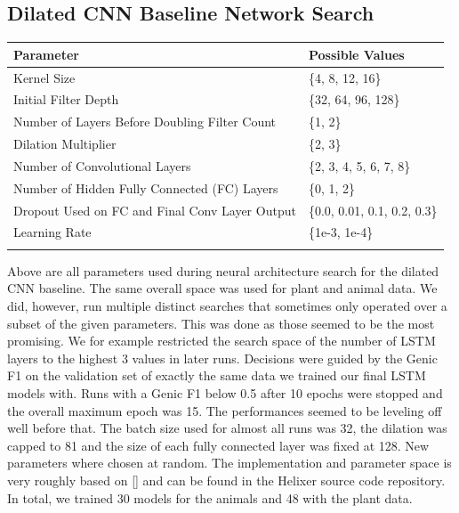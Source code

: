\documentclass{bioinfo}
\begin{document}
\subsection{Dilated CNN Baseline Network Search}
\label{sec:dcnn}
\begin{table}[!t]
 {
\begin{tabular}{@{}ll@{}}
\toprule Parameter & Possible Values \\
\midrule
Kernel Size & \{4, 8, 12, 16\}\\
Initial Filter Depth & \{32, 64, 96, 128\}\\
Number of Layers Before Doubling Filter Count & \{1, 2\}\\
Dilation Multiplier & \{2, 3\}\\
Number of Convolutional Layers & \{2, 3, 4, 5, 6, 7, 8\}\\
Number of Hidden Fully Connected (FC) Layers & \{0, 1, 2\}\\	
Dropout Used on FC and Final Conv Layer Output & \{0.0, 0.01, 0.1, 0.2, 0.3\}\\
Learning Rate & \{1e-3, 1e-4\}\\

\botrule
\end{tabular}}{Above are all parameters used during neural architecture search for the dilated CNN baseline. The same overall space was used for plant and animal data. We did, however, run multiple distinct searches that sometimes only operated over a subset of the given parameters. This was done as those seemed to be the most promising. We for example restricted the search space of the number of LSTM layers to the highest 3 values in later runs. Decisions were guided by the Genic F1 on the validation set of exactly the same data we trained our final LSTM models with. Runs with a Genic F1 below 0.5 after 10 epochs were stopped and the overall maximum epoch was 15. The performances seemed to be leveling off well before that. The batch size used for almost all runs was 32, the dilation was capped to 81 and the size of each fully connected layer was fixed at 128. New parameters where chosen at random. The implementation and parameter space is very roughly based on [\citealp{dCNNGupta}] and can be found in the Helixer source code repository. In total, we trained 30 models for the animals and 48 with the plant data.}
\end{table}
\end{document}
